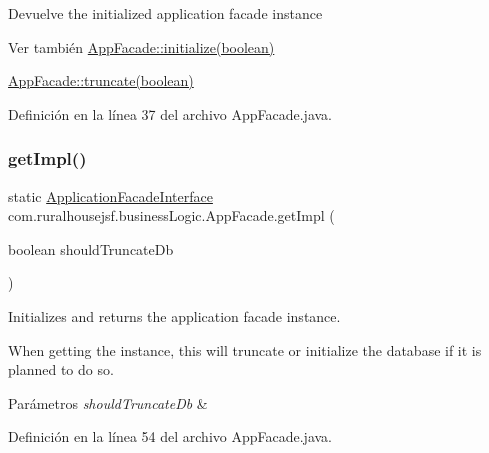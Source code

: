\begin{DoxyReturn}{Devuelve}
the initialized application facade instance
\end{DoxyReturn}
\begin{DoxySeeAlso}{Ver también}
\mbox{\hyperlink{a00128_a48252ec119a6bb16f5353df6ec6eff54}{App\+Facade\+::initialize(boolean)}} 

\mbox{\hyperlink{a00128_a98aed1ed8a03c6a92e15121fed4eb452}{App\+Facade\+::truncate(boolean)}} 
\end{DoxySeeAlso}


Definición en la línea 37 del archivo App\+Facade.\+java.

\mbox{\label{a00128_aa4bf7166aae19a2d640fd6ab8a0fff96}} 
\subsubsection{\texorpdfstring{getImpl()}{getImpl()}\hspace{0.1cm}{\footnotesize\ttfamily [2/3]}}
{\footnotesize\ttfamily static \mbox{\hyperlink{a00136}{Application\+Facade\+Interface}} com.\+ruralhousejsf.\+business\+Logic.\+App\+Facade.\+get\+Impl (\begin{DoxyParamCaption}\item[{boolean}]{should\+Truncate\+Db }\end{DoxyParamCaption})\hspace{0.3cm}{\ttfamily [static]}}



Initializes and returns the application facade instance. 

When getting the instance, this will truncate or initialize the database if it is planned to do so.


\begin{DoxyParams}{Parámetros}
{\em should\+Truncate\+Db} & \\
\hline
\end{DoxyParams}


Definición en la línea 54 del archivo App\+Facade.\+java.

\mbox{\label{a00128_aab339d9b44293704c9214aef70c7c704}} 

